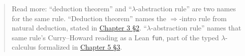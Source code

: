\begin{quote}
Read more: ``deduction theorem'' and ``\(\lambda\)-abstraction rule'' are two names for the same rule. ``Deduction theorem'' names the \(\Rightarrow\)-intro rule from natural deduction, stated in \hyperref[sec:03-propositions-and-proofs:02-logic-recap:1]{Chapter 3 §2}. ``\(\lambda\)-abstraction rule'' names that same rule's Curry--Howard reading as a Lean \texttt{fun}, part of the typed \(\lambda\)-calculus formalized in \hyperref[sec:05-rigor-check:03-typing-rules-and-safety:1]{Chapter 5 §3}.
\end{quote}

